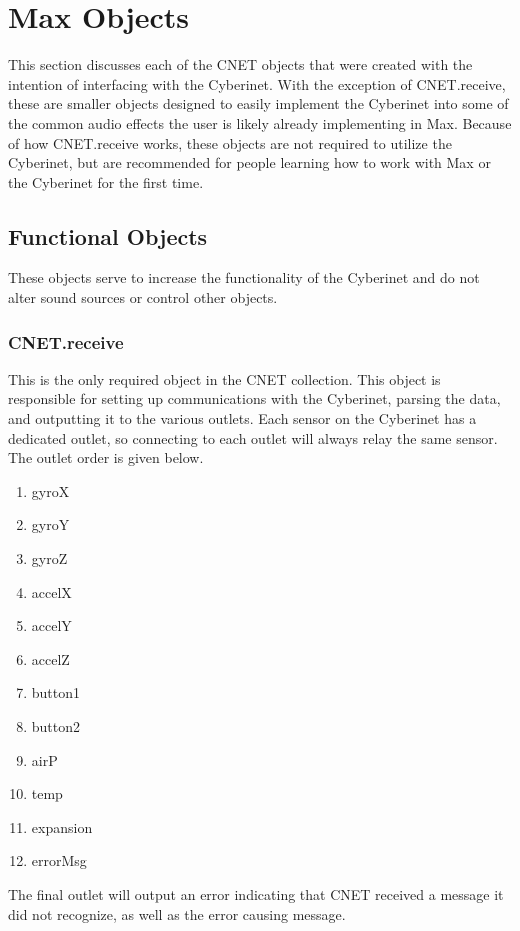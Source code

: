\section{Max Objects}
This section discusses each of the CNET objects that were created with the intention of interfacing with the Cyberinet. With the exception of CNET.receive, these are smaller objects designed to easily implement the Cyberinet into some of the common audio effects the user is likely already implementing in Max. Because of how CNET.receive works, these objects are not required to utilize the Cyberinet, but are recommended for people learning how to work with Max or the Cyberinet for the first time.

\subsection{Functional Objects}
These objects serve to increase the functionality of the Cyberinet and do not alter sound sources or control other objects.

\subsubsection{CNET.receive}
This is the only required object in the CNET collection. This object is responsible for setting up communications with the Cyberinet, parsing the data, and outputting it to the various outlets. Each sensor on the Cyberinet has a dedicated outlet, so connecting to each outlet will always relay the same sensor. The outlet order is given below.

\begin{enumerate}
    \item gyroX
    \item gyroY
    \item gyroZ
    \item accelX
    \item accelY
    \item accelZ
    \item button1
    \item button2
    \item airP
    \item temp
    \item expansion
    \item errorMsg
\end{enumerate}

The final outlet will output an error indicating that CNET received a message it did not recognize, as well as the error causing message.


